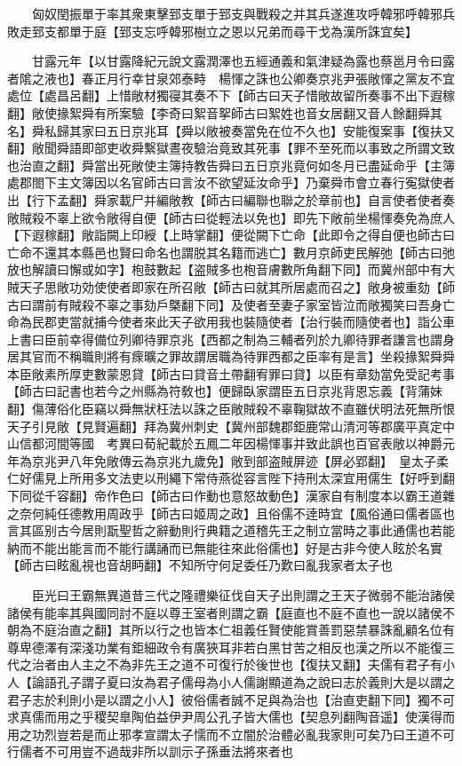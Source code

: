 　　匈奴閏振單于率其衆東擊郅支單于郅支與戰殺之并其兵遂進攻呼韓邪呼韓邪兵敗走郅支都單于庭【郅支忘呼韓邪樹立之恩以兄弟而尋干戈為漢所誅宜矣】

　　甘露元年【以甘露降紀元說文露潤澤也五經通義和氣津疑為露也蔡邕月令曰露者隂之液也】春正月行幸甘泉郊泰畤　楊惲之誅也公卿奏京兆尹張敞惲之黨友不宜處位【處昌呂翻】上惜敞材獨寑其奏不下【師古曰天子惜敞故留所奏事不出下遐稼翻】敞使掾絮舜有所案驗【李奇曰絮音挐師古曰絮姓也音女居翻又音人餘翻舜其名】舜私歸其家曰五日京兆耳【舜以敞被奏當免在位不久也】安能復案事【復扶又翻】敞聞舜語即部吏收舜繫獄晝夜驗治竟致其死事【罪不至死而以事致之所謂文致也治直之翻】舜當出死敞使主簿持教告舜曰五日京兆竟何如冬月已盡延命乎【主簿處郡閤下主文簿因以名官師古曰言汝不欲望延汝命乎】乃棄舜市會立春行寃獄使者出【行下孟翻】舜家載尸并編敞教【師古曰編聯也聯之於章前也】自言使者使者奏敞賊殺不辜上欲令敞得自便【師古曰從輕法以免也】即先下敞前坐楊惲奏免為庶人【下遐稼翻】敞詣闕上印綬【上時掌翻】便從闕下亡命【此即令之得自便也師古曰亡命不還其本縣邑也賢曰命名也謂脱其名籍而逃亡】數月京師吏民解弛【師古曰弛放也解讀曰懈或如字】枹鼓數起【盗賊多也枹音膚數所角翻下同】而冀州部中有大賊天子思敞功効使使者即家在所召敞【師古曰就其所居處而召之】敞身被重劾【師古曰謂前有賊殺不辜之事劾戶槩翻下同】及使者至妻子家室皆泣而敞獨笑曰吾身亡命為民郡吏當就捕今使者來此天子欲用我也裝隨使者【治行裝而隨使者也】詣公車上書曰臣前幸得備位列卿待罪京兆【西都之制為三輔者列於九卿待罪者謙言也謂身居其官而不稱職則將有瘝曠之罪故謂居職為待罪西都之臣率有是言】坐殺掾絮舜舜本臣敞素所厚吏數蒙恩貸【師古曰貸音土帶翻宥罪曰貸】以臣有章劾當免受記考事【師古曰記書也若今之州縣為符敎也】便歸臥家謂臣五日京兆背恩忘義【背蒲妹翻】傷薄俗化臣竊以舜無狀枉法以誅之臣敞賊殺不辜鞠獄故不直雖伏明法死無所恨天子引見敞【見賢遍翻】拜為冀州刺史【冀州部魏郡鉅鹿常山清河等郡廣平真定中山信都河間等國　考異曰荀紀載於五鳳二年因楊惲事并致此誤也百官表敞以神爵元年為京兆尹八年免敞傳云為京兆九歲免】敞到部盗賊屏迹【屏必郢翻】　皇太子柔仁好儒見上所用多文法吏以刑繩下常侍燕從容言陛下持刑太深宜用儒生【好呼到翻下同從千容翻】帝作色曰【師古曰作動也意怒故動色】漢家自有制度本以霸王道雜之奈何純任德教用周政乎【師古曰姬周之政】且俗儒不逹時宜【風俗通曰儒者區也言其區别古今居則翫聖哲之辭動則行典籍之道稽先王之制立當時之事此通儒也若能納而不能出能言而不能行講誦而已無能往來此俗儒也】好是古非今使人眩於名實【師古曰眩亂視也音胡眄翻】不知所守何足委任乃歎曰亂我家者太子也

　　臣光曰王霸無異道昔三代之隆禮樂征伐自天子出則謂之王天子微弱不能治諸侯諸侯有能率其與國同討不庭以尊王室者則謂之霸【庭直也不庭不直也一說以諸侯不朝為不庭治直之翻】其所以行之也皆本仁祖義任賢使能賞善罰惡禁暴誅亂顧名位有尊卑德澤有深淺功業有鉅細政令有廣狹耳非若白黑甘苦之相反也漢之所以不能復三代之治者由人主之不為非先王之道不可復行於後世也【復扶又翻】夫儒有君子有小人【論語孔子謂子夏曰汝為君子儒母為小人儒謝顯道為之說曰志於義則大是以謂之君子志於利則小是以謂之小人】彼俗儒者誠不足與為治也【治直吏翻下同】獨不可求真儒而用之乎稷契臯陶伯益伊尹周公孔子皆大儒也【契息列翻陶音遥】使漢得而用之功烈豈若是而止邪孝宣謂太子懦而不立闇於治體必亂我家則可矣乃曰王道不可行儒者不可用豈不過哉非所以訓示子孫垂法將來者也

